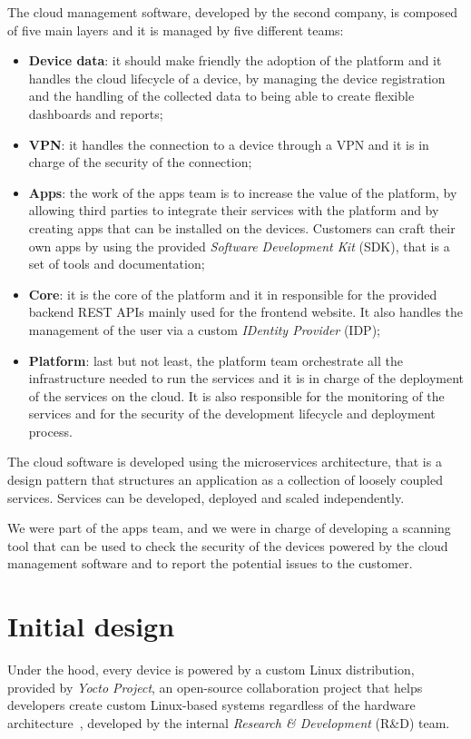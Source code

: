 The cloud management software, developed by the second company, is composed of five main layers and it is managed by five different teams:
\begin{itemize}
  \item \textbf{Device data}: it should make friendly the adoption of the platform and it handles the cloud lifecycle of a device, by managing the device registration and the handling of the collected data to being able to create flexible dashboards and reports;
  \item \textbf{VPN}: it handles the connection to a device through a VPN and it is in charge of the security of the connection;
  \item \textbf{Apps}: the work of the apps team is to increase the value of the platform, by allowing third parties to integrate their services with the platform and by creating apps that can be installed on the devices. Customers can craft their own apps by using the provided \textit{Software Development Kit} (SDK), that is a set of tools and documentation;
  \item \textbf{Core}: it is the core of the platform and it in responsible for the provided backend REST APIs mainly used for the frontend website. It also handles the management of the user via a custom \textit{IDentity Provider} (IDP);
  \item \textbf{Platform}: last but not least, the platform team orchestrate all the infrastructure needed to run the services and it is in charge of the deployment of the services on the cloud. It is also responsible for the monitoring of the services and for the security of the development lifecycle and deployment process.
\end{itemize}

The cloud software is developed using the microservices architecture, that is a design pattern that structures an application as a collection of loosely coupled services. Services can be developed, deployed and scaled independently.

We were part of the apps team, and we were in charge of developing a scanning tool that can be used to check the security of the devices powered by the cloud management software and to report the potential issues to the customer.

\section{Initial design}

Under the hood, every device is powered by a custom Linux distribution, provided by \textit{Yocto Project}, an open-source collaboration project that helps developers create custom Linux-based systems regardless of the hardware architecture~\cite{yocto-project}, developed by the internal \textit{Research \& Development} (R\&D) team.

